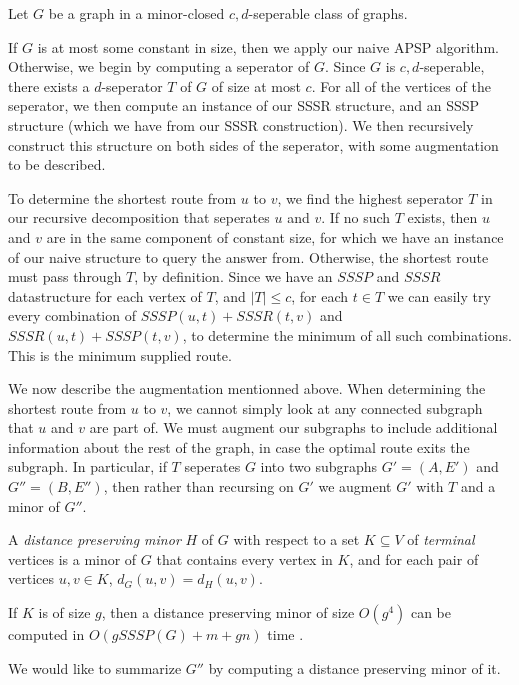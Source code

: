 \documentclass{cccg13}
\begin{document}
Let $G$ be a graph in a minor-closed $c,d$-seperable class of graphs. 

If $G$ is at most some constant in size, then we apply our naive APSP algorithm. Otherwise, we begin by computing a seperator of $G$. Since $G$ is $c,d$-seperable, there exists a $d$-seperator $T$ of $G$ of size at most $c$. For all of the vertices of the seperator, we then compute an instance of our SSSR structure, and an SSSP structure (which we have from our SSSR construction). We then recursively construct this structure on both sides of the seperator, with some augmentation to be described. 

To determine the shortest \supplied{} route from $u$ to $v$, we find the highest seperator $T$ in our recursive decomposition that seperates $u$ and $v$. If no such $T$ exists, then $u$ and $v$ are in the same component of constant size, for which we have an instance of our naive structure to query the answer from. Otherwise, the shortest \supplied{} route must pass through $T$, by definition. Since we have an $SSSP$ and $SSSR$ datastructure for each vertex of $T$, and $|T| \leq c$, for each $t \in T$ we can easily try every combination of $SSSP(u, t) + SSSR(t, v)$ and $SSSR(u, t) + SSSP(t, v)$, to determine the minimum of all such combinations. This is the minimum supplied route.

We now describe the augmentation mentionned above. When determining the shortest \supplied{} route from $u$ to $v$, we cannot simply look at any connected subgraph that $u$ and $v$ are part of. We must augment our subgraphs to include additional information about the rest of the graph, in case the optimal route exits the subgraph. In particular, if $T$ seperates $G$ into two subgraphs $G' = (A, E')$ and $G'' = (B, E'')$, then rather than recursing on $G'$ we augment $G'$ with $T$ and a minor of $G''$.

\begin{defn}
    A \emph{distance preserving minor} $H$ of $G$ with respect to a set $K \subseteq V$ of \emph{terminal} vertices is a minor of $G$ that contains every vertex in $K$, and for each pair of vertices $u,v \in K$, $d_G(u,v) = d_H(u, v)$.
\end{defn}

If $K$ is of size $g$, then a distance preserving minor of size $O(g^4)$ can be computed in $O(gSSSP(G) + m + gn)$ time \cite{distance-preserving-minor}.

We would like to summarize $G''$ by computing a distance preserving minor of it. 
\end{document}

